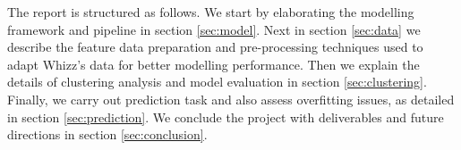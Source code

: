 The report is structured as follows. We start by elaborating the modelling framework and pipeline in section \ref{sec:model}. Next in section \ref{sec:data} we describe the feature data preparation and pre-processing techniques used to adapt Whizz's data for better modelling performance. Then we explain the details of clustering analysis and model evaluation in section \ref{sec:clustering}. Finally, we carry out prediction task and also assess overfitting issues, as detailed in section \ref{sec:prediction}. We conclude the project with deliverables and future directions in section \ref{sec:conclusion}.
